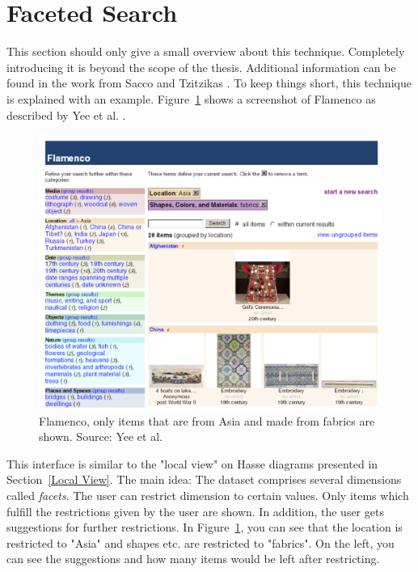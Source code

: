 \documentclass[11pt]{report}
\begin{document}
\section{Faceted Search}
\label{dyafs}

This section should only give a small overview about this technique. Completely introducing it is beyond the scope of the thesis. Additional information can be found in the work from Sacco and Tzitzikas \cite{Sacco2009}. To keep things short, this technique is explained with an example. Figure~\ref{figure:flamenco} shows a screenshot of Flamenco as described by Yee et al. \cite{Yee2003}. \\

\begin{figure}[!ht]
	\centering
	\includegraphics[width=\linewidth]{images/flamenco}
\caption{Flamenco, only items that are from Asia and made from fabrics are shown. Source: Yee et al. \cite{Yee2003}}
\label{figure:flamenco}
\end{figure}

This interface is similar to the "local view" on Hasse diagrams presented in Section~\ref{Local View}. The main idea: The dataset comprises several dimensions called \textit{facets}. The user can restrict dimension to certain values. Only items which fulfill the restrictions given by the user are shown. In addition, the user gets suggestions for further restrictions. In Figure~\ref{figure:flamenco}, you can see that the location is restricted to "Asia" and shapes etc. are restricted to "fabrics". On the left, you can see the suggestions and how many items would be left after restricting. \\
\end{document}
